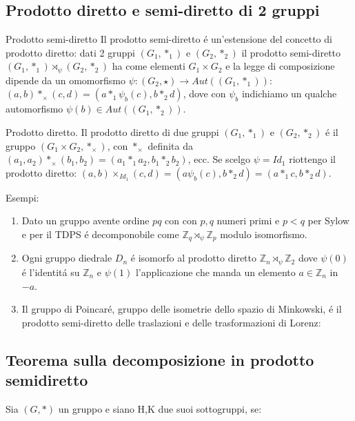 \documentclass[oneside,12pt]{memoir}
\begin{document}
\subsection{Prodotto diretto e semi-diretto di 2 gruppi}
\begin{definition}{Prodotto semi-diretto}
Il prodotto semi-diretto \'e un'estensione del concetto di prodotto diretto: dati 2 gruppi $(G_1,*_1)$ e $(G_2,*_2)$ il prodotto semi-diretto $(G_1,*_1)\rtimes_{\psi}(G_2,*_2)$ ha come elementi $G_1\times G_2$ e la legge di composizione dipende da un omomorfismo $\psi :(G_2,\star) \rightarrow Aut((G_1,*_1))$: $(a,b)*_{\times}(c,d)=(a*_1\psi_b(c),b *_2 d)$, dove con $\psi_b$ indichiamo un qualche automorfismo $\psi(b) \in Aut((G_1,*_2))$.
\end{definition}

\begin{definition}{Prodotto diretto.}
Il prodotto diretto di due gruppi $(G_1,*_1)$ e $(G_2,*_2)$ \'e il gruppo $(G_1\times G_2,*_{\times})$, con $*_{\times}$ definita da $(a_1,a_2)*_{\times}(b_1,b_2)=(a_1*_1a_2,b_1*_2b_2)$, ecc.
Se scelgo $\psi=Id_1$ riottengo il prodotto diretto: $(a,b)\times_{Id_1}(c,d)=(a\psi_b(c),b*_2d)=(a*_1c,b*_2d)$.
\end{definition}

Esempi:

\begin{enumerate}
\item Dato un gruppo avente ordine $pq$ con con $p,q$ numeri primi e $p<q$ per Sylow e per il TDPS \'e decomponobile come $\mathbb{Z}_q \rtimes_{\psi} \mathbb{Z}_p$ modulo isomorfismo.
\item Ogni gruppo diedrale $D_n$ \'e isomorfo al prodotto diretto $\mathbb{Z}_n \rtimes_{\psi} \mathbb{Z}_2$ dove $\psi(0)$ \'e l'identit\'a su $\mathbb{Z}_n$ e $\psi(1)$ l'applicazione che manda un elemento $a\in \mathbb{Z}_n$ in $-a$.
\item Il gruppo di Poincar\'e, gruppo delle isometrie dello spazio di Minkowski, \'e il prodotto semi-diretto delle traslazioni e delle trasformazioni di Lorenz:


\end{enumerate}



\subsection{Teorema sulla decomposizione in prodotto semidiretto}

Sia $(G,*)$ un gruppo e siano H,K due suoi sottogruppi, se: 
\end{document}
